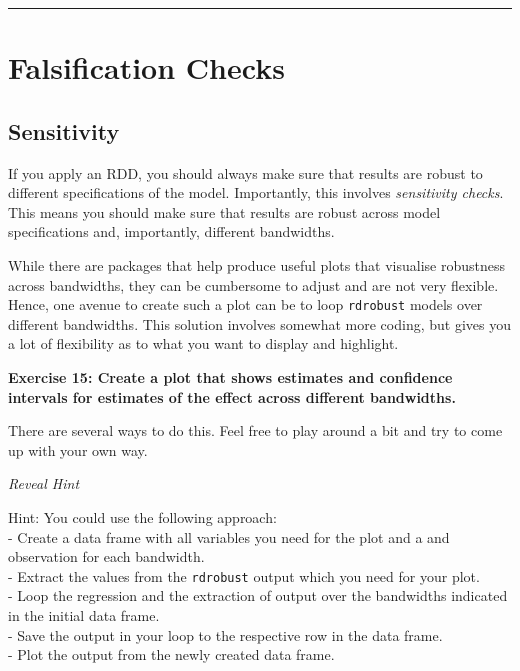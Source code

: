 \documentclass[
  letterpaper,
  DIV=11,
  numbers=noendperiod]{scrreprt}
\begin{document}
\hfill\break

\begin{center}\rule{0.5\linewidth}{0.5pt}\end{center}

\hypertarget{falsification-checks}{%
\section{Falsification Checks}\label{falsification-checks}}

\hypertarget{sensitivity}{%
\subsection{Sensitivity}\label{sensitivity}}

If you apply an RDD, you should always make sure that results are robust
to different specifications of the model. Importantly, this involves
\emph{sensitivity checks}. This means you should make sure that results
are robust across model specifications and, importantly, different
bandwidths.

While there are packages that help produce useful plots that visualise
robustness across bandwidths, they can be cumbersome to adjust and are
not very flexible. Hence, one avenue to create such a plot can be to
loop \texttt{rdrobust} models over different bandwidths. This solution
involves somewhat more coding, but gives you a lot of flexibility as to
what you want to display and highlight.

\hfill\break

\textbf{Exercise 15: Create a plot that shows estimates and confidence
intervals for estimates of the effect across different bandwidths.}

There are several ways to do this. Feel free to play around a bit and
try to come up with your own way.

\emph{Reveal Hint}

Hint: You could use the following approach:\\
- Create a data frame with all variables you need for the plot and a and
observation for each bandwidth.\\
- Extract the values from the \texttt{rdrobust} output which you need
for your plot.\\
- Loop the regression and the extraction of output over the bandwidths
indicated in the initial data frame.\\
- Save the output in your loop to the respective row in the data
frame.\\
- Plot the output from the newly created data frame.
\end{document}
